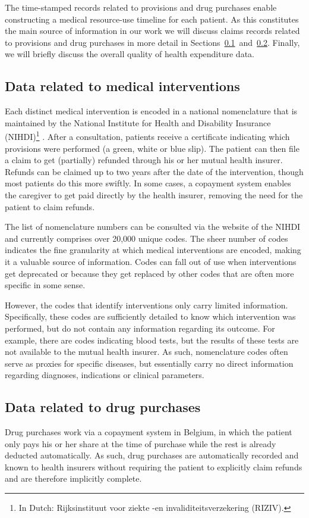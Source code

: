 The time-stamped records related to provisions and drug purchases enable constructing a medical resource-use timeline for each patient. As this constitutes the main source of information in our work we will discuss claims records related to provisions and drug purchases in more detail in Sections~\ref{intro:interventions}~and~\ref{intro:drugs}. Finally, we will briefly discuss the overall quality of health expenditure data.


\subsection{Data related to medical interventions} \label{intro:interventions}
Each distinct medical intervention is encoded in a national nomenclature that is maintained by the National Institute for Health and Disability Insurance (NIHDI)\footnote{In Dutch: Rijksinstituut voor ziekte -en invaliditeitsverzekering (RIZIV).} \citep{van2008financing}. After a consultation, patients receive a certificate indicating which provisions were performed (a green, white or blue slip). The patient can then file a claim to get (partially) refunded through his or her mutual health insurer. Refunds can be claimed up to two years after the date of the intervention, though most patients do this more swiftly. In some cases, a copayment system enables the caregiver to get paid directly by the health insurer, removing the need for the patient to claim refunds.

The list of nomenclature numbers can be consulted via the website of the NIHDI and currently comprises over 20,000 unique codes. The sheer number of codes indicates the fine granularity at which medical interventions are encoded, making it a valuable source of information. Codes can fall out of use when interventions get deprecated or because they get replaced by other codes that are often more specific in some sense.

However, the codes that identify interventions only carry limited information. Specifically, these codes are sufficiently detailed to know which intervention was performed, but do not contain any information regarding its outcome. For example, there are codes indicating blood tests, but the results of these tests are not available to the mutual health insurer. As such, nomenclature codes often serve as proxies for specific diseases, but essentially carry no direct information regarding diagnoses, indications or clinical parameters.

\subsection{Data related to drug purchases} \label{intro:drugs}
Drug purchases work via a copayment system in Belgium, in which the patient only pays his or her share at the time of purchase while the rest is already deducted automatically. As such, drug purchases are automatically recorded and known to health insurers without requiring the patient to explicitly claim refunds and are therefore implicitly complete.

